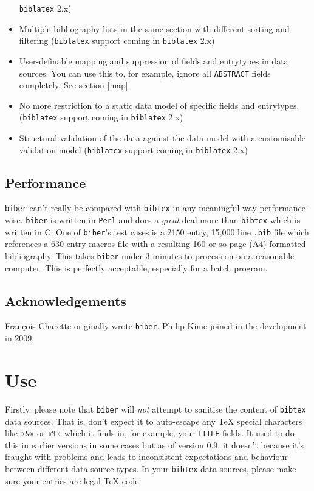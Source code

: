 \documentclass{ltxdockit}
\begin{document}
\begin{itemize}
  \verb+biblatex+ 2.x)
\item Multiple bibliography lists in the same section with different
  sorting and filtering (\verb+biblatex+ support coming in \verb+biblatex+ 2.x)
\item User-definable mapping and suppression of fields and entrytypes in
  data sources. You can use this to, for example, ignore all
  \verb+ABSTRACT+ fields completely. See section \ref{map}
\item No more restriction to a static data model of specific fields and
  entrytypes. (\verb+biblatex+ support coming in \verb+biblatex+ 2.x)
\item Structural validation of the data against the data model with a
  customisable validation model (\verb+biblatex+ support coming in
  \verb+biblatex+ 2.x)
\end{itemize}

\subsection{Performance}

\verb+biber+ can't really be compared with \verb+bibtex+ in any meaningful
way performance-wise. \verb+biber+ is written in \verb+Perl+ and does a
\emph{great} deal more than \verb+bibtex+ which is written in C. One of
\verb+biber+'s test cases is a 2150 entry, 15,000 line \verb+.bib+ file
which references a 630 entry macros file with a resulting 160 or so page (A4)
formatted bibliography. This takes \verb+biber+ under 3 minutes to process on
on a reasonable computer. This is perfectly acceptable, especially for a
batch program.

\subsection{Acknowledgements}

François Charette originally wrote \verb+biber+. Philip Kime joined in
the development in 2009.

\section{Use}

Firstly, please note that \verb+biber+ will \emph{not} attempt to sanitise
the content of \verb+bibtex+ data sources. That is, don't expect it to
auto-escape any TeX special characters like «\verb+&+» or «\verb+%+» which
it finds in, for example, your \verb+TITLE+ fields. It used to do this in
earlier versions in some cases but as of version 0.9, it doesn't because
it's fraught with problems and leads to inconsistent expectations and
behaviour between different data source types. In your \verb+bibtex+ data
sources, please make sure your entries are legal TeX code.
\end{document}
